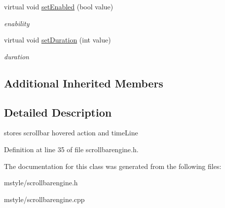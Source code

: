 \begin{DoxyCompactItemize}
virtual void \hyperlink{class_scroll_bar_engine_a60a5adfda11954c0ab8fbd0afe39be65}{set\+Enabled} (bool value)
\begin{DoxyCompactList}\small\item\em enability \end{DoxyCompactList}\item 
\mbox{\label{class_scroll_bar_engine_aa1d129232fd8aafffb359871f01de147}} 
virtual void \hyperlink{class_scroll_bar_engine_aa1d129232fd8aafffb359871f01de147}{set\+Duration} (int value)
\begin{DoxyCompactList}\small\item\em duration \end{DoxyCompactList}\end{DoxyCompactItemize}
\subsection*{Additional Inherited Members}


\subsection{Detailed Description}
stores scrollbar hovered action and time\+Line 

Definition at line 35 of file scrollbarengine.\+h.



The documentation for this class was generated from the following files\+:\begin{DoxyCompactItemize}
\item 
mstyle/scrollbarengine.\+h\item 
mstyle/scrollbarengine.\+cpp\end{DoxyCompactItemize}
